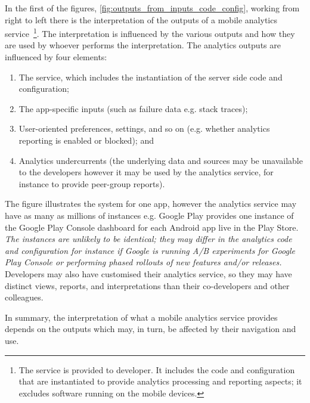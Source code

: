 In the first of the figures, \ref{fig:outputs_from_inputs_code_config}, working from right to left there is the interpretation of the outputs of a mobile analytics service~\footnote{The service is provided to developer. It includes the code and configuration that are instantiated to provide analytics processing and reporting aspects; it excludes software running on the mobile devices.}. The interpretation is influenced by the various outputs and how they are used by whoever performs the interpretation. The analytics outputs are influenced by four elements: 
\begin{enumerate}
    \itemsep0em
    \item The service, which includes the instantiation of the server side code and configuration; 
    \item The app-specific inputs (such as failure data e.g. stack traces); 
    \item User-oriented preferences, settings, and so on (e.g. whether analytics reporting is enabled or blocked); and 
    \item Analytics undercurrents (the underlying data and sources may be unavailable to the developers however it may be used by the analytics service, for instance to provide peer-group reports).
\end{enumerate}

The figure illustrates the system for one app, however the analytics service may have as many as millions of instances e.g. Google Play provides one instance of the Google Play Console dashboard for each Android app live in the Play Store. \emph{The instances are unlikely to be identical; they may differ in the analytics code and configuration for instance if Google is running A/B experiments for Google Play Console or performing phased rollouts of new features and/or releases.} Developers may also have customised their analytics service, so they may have distinct views, reports, and interpretations than their co-developers and other colleagues.

In summary, the interpretation of what a mobile analytics service provides depends on the outputs which may, in turn, be affected by their navigation and use. 

